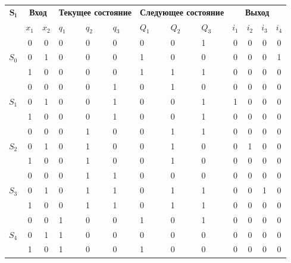 \documentclass[11pt,a4paper,final]{article} %
\begin{document}
\newpage
\begin{table}[H]
\begin{tabularx}{\textwidth}{|c|c|c|p{1cm}|p{1cm}|p{1cm}|p{1cm}|p{1cm}|p{1cm}|c|c|c|c|}
	\cline{1-13}
	$\mathbf{S_i}$ & \multicolumn{2}{c|}{\textbf{Вход}} & \multicolumn{3}{c|}{\textbf{Текущее состояние}} & \multicolumn{3}{c|}{\textbf{Следующее состояние}} & \multicolumn{4}{c|}{\textbf{Выход}}  \\
	\cline{1-13}
	
	& $x_1$ & $x_2$ & $q_1$ & $q_2$ & $q_3$ & $Q_1$ & $Q_2$ & $Q_3$ & $i_1$ & $i_2$ & $i_3$ & $i_4$ \\
	\cline{1-13}
	
	\multirow{3}{*}{$S_0$} & 0 & 0 & 0 & 0 & 0 & 0 & 0 & 1 & 0 & 0 & 0 & 0 \\
	\cline{2-13}
						   & 0 & 1 & 0 & 0 & 0 & 1 & 0 & 0 & 0 & 0 & 0 & 1 \\
	\cline{2-13}
 						   & 1 & 0 & 0 & 0 & 0 & 1 & 1 & 1 & 0 & 0 & 0 & 0 \\
 	
 	\cline{1-13}
 	\multirow{3}{*}{$S_1$} & 0 & 0 & 0 & 0 & 1 & 0 & 1 & 0 & 0 & 0 & 0 & 0 \\
 	\cline{2-13}
 						   & 0 & 1 & 0 & 0 & 1 & 0 & 0 & 1 & 1 & 0 & 0 & 0 \\
 	\cline{2-13}				   
 						   & 1 & 0 & 0 & 0 & 1 & 0 & 0 & 1 & 0 & 0 & 0 & 0 \\
 	\cline{1-13}
 	
 	\multirow{3}{*}{$S_2$} & 0 & 0 & 0 & 1 & 0 & 0 & 1 & 1 & 0 & 0 & 0 & 0 \\
 	\cline{2-13}
 					   	   & 0 & 1 & 0 & 1 & 0 & 0 & 1 & 0 & 0 & 1 & 0 & 0 \\
 	\cline{2-13}
 	 					   & 1 & 0 & 0 & 1 & 0 & 0 & 1 & 0 & 0 & 0 & 0 & 0 \\
 	\cline{1-13}
 	
 	\multirow{3}{*}{$S_3$} & 0 & 0 & 0 & 1 & 1 & 0 & 0 & 0 & 0 & 0 & 0 & 0 \\
 	\cline{2-13}
 	 					   & 0 & 1 & 0 & 1 & 1 & 0 & 1 & 1 & 0 & 0 & 1 & 0 \\
 	\cline{2-13}					   
 	 					   & 1 & 0 & 0 & 1 & 1 & 0 & 1 & 1 & 0 & 0 & 0 & 0 \\
 	\cline{1-13}
 	
 	\multirow{3}{*}{$S_4$} & 0 & 0 & 1 & 0 & 0 & 1 & 0 & 1 & 0 & 0 & 0 & 0 \\
 	\cline{2-13}
 						   & 0 & 1 & 1 & 0 & 0 & 0 & 0 & 0 & 0 & 0 & 0 & 0 \\
	\cline{2-13} 						   
 						   & 1 & 0 & 1 & 0 & 0 & 1 & 0 & 0 & 0 & 0 & 0 & 0 \\
 	\cline{1-13}
 	

\end{tabularx}
\end{table}
\end{document}
